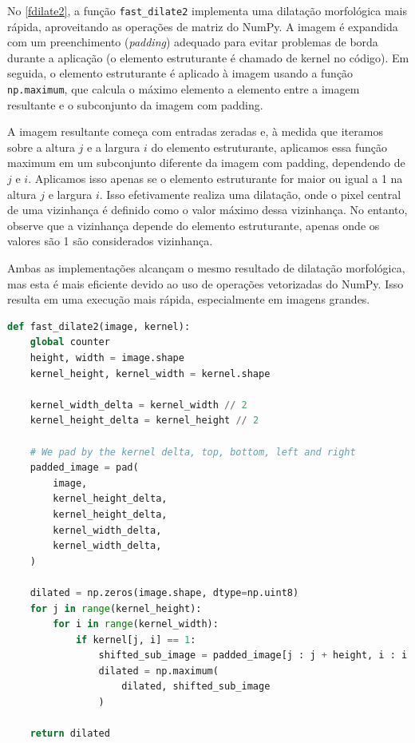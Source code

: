 \documentclass[english, 
               brazil, 
               bsc] %
               {dcomp-abntex2}
\begin{document}
No \autoref{fdilate2}, a função \texttt{fast\_dilate2} implementa uma dilatação morfológica mais rápida, aproveitando as operações de matriz do NumPy. A imagem é expandida com um preenchimento (\textit{padding}) adequado para evitar problemas de borda durante a aplicação (o elemento estruturante é chamado de kernel no código). Em seguida, o elemento estruturante é aplicado à imagem usando a função \texttt{np.maximum}, que calcula o máximo elemento a elemento entre a imagem resultante e o subconjunto da imagem com padding.

A imagem resultante começa com entradas zeradas e, à medida que iteramos sobre a altura $j$ e a largura $i$ do elemento estruturante, aplicamos essa função maximum em um subconjunto diferente da imagem com padding, dependendo de $j$ e $i$. Aplicamos isso apenas se o elemento estruturante for maior ou igual a 1 na altura $j$ e largura $i$. Isso efetivamente realiza uma dilatação, onde o pixel central de uma vizinhança é definido como o valor máximo dessa vizinhança. No entanto, observe que a vizinhança depende do elemento estruturante, apenas onde os valores são 1 são considerados vizinhança.

Ambas as implementações alcançam o mesmo resultado de dilatação morfológica, mas esta é mais eficiente devido ao uso de operações vetorizadas do NumPy. Isso resulta em uma execução mais rápida, especialmente em imagens grandes.

\begin{codigo}[h]
  \caption{\small.}
 \label{fdilate2}
\begin{lstlisting}[language=python]
def fast_dilate2(image, kernel):
    global counter 
    height, width = image.shape
    kernel_height, kernel_width = kernel.shape

    kernel_width_delta = kernel_width // 2
    kernel_height_delta = kernel_height // 2

    # We pad by the kernel delta, top, bottom, left and right
    padded_image = pad(
        image,
        kernel_height_delta,
        kernel_height_delta,
        kernel_width_delta,
        kernel_width_delta,
    )

    dilated = np.zeros(image.shape, dtype=np.uint8)
    for j in range(kernel_height):
        for i in range(kernel_width):
            if kernel[j, i] == 1:
                shifted_sub_image = padded_image[j : j + height, i : i + width]
                dilated = np.maximum(
                    dilated, shifted_sub_image
                )

    return dilated
\end{lstlisting}
\end{codigo}
\end{document}
